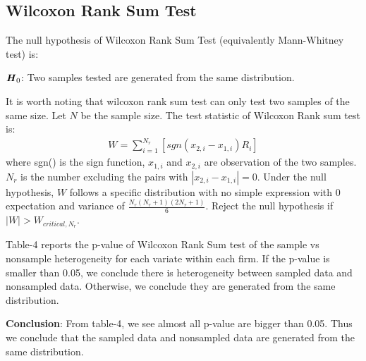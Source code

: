 \documentclass[12pt,]{article}
\begin{document}
\subsection{Wilcoxon Rank Sum Test}
The null hypothesis of Wilcoxon Rank Sum Test (equivalently Mann-Whitney test) is:
\begin{center}
$\textbf{\textit{H}}_0$: Two samples tested are generated from the same distribution.
\end{center}
It is worth noting that wilcoxon rank sum test can only test two samples of the same size. Let $N$ be the sample size. The test statistic of Wilcoxon Rank sum test is:
\begin{align}
W = \sum_{i = 1}^{N_r}[sgn(x_{2,i} - x_{1,i}) R_i]
\end{align}
where sgn() is the sign function, $x_{1, i}$ and $x_{2, i}$ are observation of the two samples. $N_r$ is the number excluding the pairs with $|x_{2, i} - x_{1, i}| = 0$. Under the null hypothesis, $W$ follows a specific distribution with no simple expression with 0 expectation and variance of $\frac{N_r(N_r + 1)(2N_r + 1)}{6}$. Reject the null hypothesis if $|W| > W_{critical, N_r}$.


Table-4 reports the p-value of Wilcoxon Rank Sum test of the sample vs nonsample heterogeneity for each variate within each firm. If the p-value is smaller than 0.05, we conclude there is heterogeneity between sampled data and nonsampled data. Otherwise, we conclude they are generated from the same distribution.


\textbf{Conclusion}: From table-4, we see almost all p-value are bigger than 0.05. Thus we conclude that the sampled data and nonsampled data are generated from the same distribution.
\end{document}
